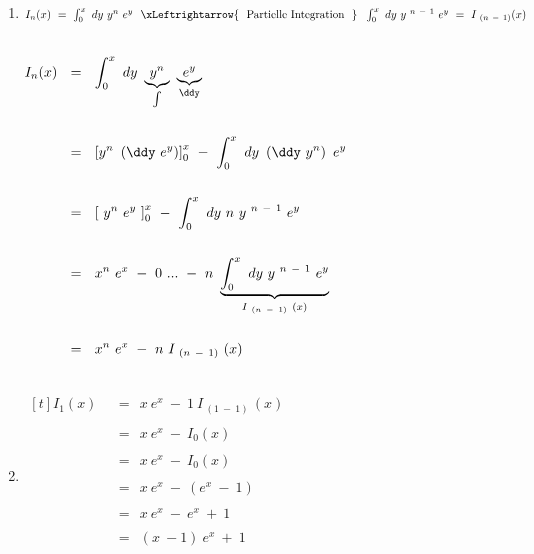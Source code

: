 \begin{enumerate}[leftmargin=*, labelsep=2em, itemsep=3em, label=\alph*)]
	
	\item \hfill \break
	
	$I_n(x) ~ = ~ \int_{0}^{x} ~ dy ~ y^n ~ e^y ~~ \xLeftrightarrow{\text{~ Partielle Integration ~}} ~~ \int_{0}^{x} ~ dy ~ y^{ ~ n ~ - ~ 1} ~ e^y ~ = ~ I_{~ (n ~ - ~ 1)}(x)$
	
	~\\
	
	$\begin{aligned}[t]
	I_n(x) ~~ &= ~~ \int_{0}^{x} ~ dy ~ \underbrace{ y^n }_{ \int } ~ \underbrace{ e^y }_{ \ddy } \\ \\
	&= ~~ \left[ y^n ~ \left( \ddy ~ e^y \right) \right]_{ 0 }^{ x } ~ - ~ \int_{0}^{x} ~ dy ~ \left( \ddy ~ y^n \right) ~ e^y \\ \\
	&= ~~ \left[ ~ y^n ~ e^y ~ \right]_{ 0 }^{ x } ~ - ~ \int_{0}^{x} ~ dy ~ n ~ y^{ ~ n ~ - ~ 1} ~ e^y \\ \\
	&= ~~ x^n ~ e^x ~ - ~ 0 ~ ... ~ - ~ n ~ \underbrace{ \int_{0}^{x} ~ dy ~ y^{ ~ n ~ - ~ 1} ~ e^y }_{ I_{~ (n ~ - ~ 1) ~}(x) } \\ \\
	&= ~~ x^n ~ e^x ~ - ~ n ~ I_{~ (n ~ - ~ 1) ~}(x) \\ \\
	\end{aligned}$ ~\\ 
	
	
	\item \hfill \break
	
	$\begin{aligned}[t]
	I_1(x) ~~ &= ~~ x ~ e^x ~ - ~ 1 ~ I_{~ (1 ~ - ~ 1) ~}(x) \\ \\
	&= ~~ x ~ e^x ~ - ~ I_{0}(x) \\ \\
	&= ~~ x ~ e^x ~ - ~ I_{0}(x) \\ \\
	&= ~~ x ~ e^x ~ - ~ \left( e^x ~ - ~ 1 \right) \\ \\
	&= ~~ x ~ e^x ~ - ~ e^x ~ + ~ 1 \\ \\
	&= ~~ \left( x ~ - 1 \right) ~ e^x ~ + ~ 1 \\ \\
	\end{aligned}$
	

\end{enumerate}
